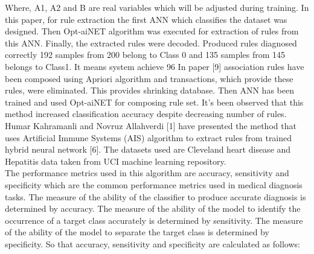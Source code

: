 \documentclass[a4paper,14pt,onecolumn]{article}
\begin{document}
Where, A1, A2 and B are real variables which will be adjusted during training.
     In this paper, for rule extraction the first ANN which classifies the dataset was designed. Then Opt-aiNET algorithm was executed for extraction of rules from this ANN. Finally, the extracted rules were decoded. Produced rules diagnosed correctly 192 samples from 200 belong to Class 0 and 135 samples from 145 belongs to Class1. It means system achieve 96%
     In paper [9] association rules have been composed using Apriori algorithm and transactions, which provide these rules, were eliminated. This provides shrinking database. Then ANN has been trained and used Opt-aiNET for composing rule set. It’s been observed that this method increased classification accuracy despite decreasing number of rules.\\ 
     Humar Kahramanli and  Novruz Allahverdi [1] have presented the method that uses Artificial Immune Systems (AIS) algorithm to extract rules from trained hybrid neural network [6]. The datasets used are Cleveland heart disease and Hepatitis data taken from UCI machine learning repository.\\ 
     The performance metrics used in this algorithm are accuracy, sensitivity and specificity which are the common performance metrics used in medical diagnosis tasks. The measure of the ability of the classifier to produce accurate diagnosis is determined by accuracy. The measure of the ability of the model to identify the occurrence of a target class accurately is determined by sensitivity. The measure of the ability of the model to separate the target class is determined by specificity. So that accuracy, sensitivity and specificity are calculated as follows:\\
\end{document}
